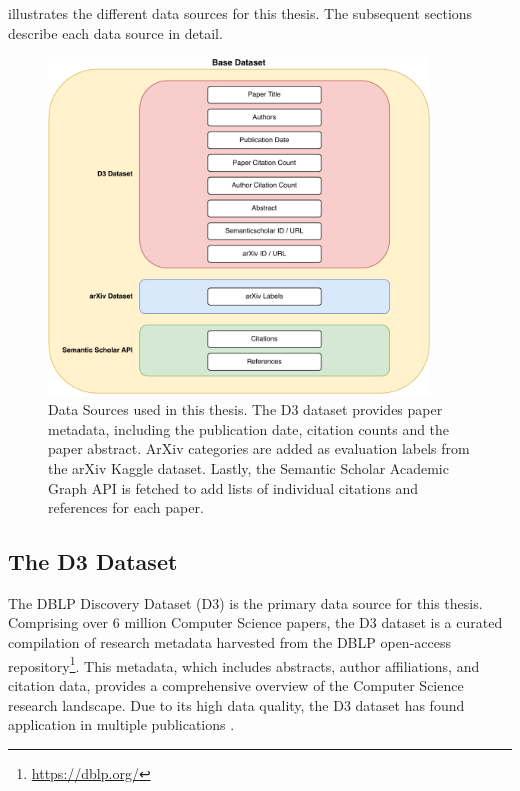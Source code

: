  illustrates the different data sources for this thesis. The subsequent sections describe each data source in detail.

\begin{figure}[htb!]
      \centering
      \includegraphics[width=0.9\textwidth]{diagrams/dataset_construction.pdf}
      \caption[Data Sources]{Data Sources used in this thesis. The D3 dataset provides paper metadata, including the publication date, citation counts and the paper abstract. ArXiv categories are added as evaluation labels from the arXiv Kaggle dataset. Lastly, the Semantic Scholar Academic Graph API is fetched to add lists of individual citations and references for each paper.}
      \label{fig:dataset-construction}
\end{figure}


\subsection{The D3 Dataset} \label{sec:d3-dataset}

The DBLP Discovery Dataset (D3) \cite{WahleD3Massive2022} is the primary data source for this thesis. Comprising over 6 million Computer Science papers, the D3 dataset is a curated compilation of research metadata harvested from the DBLP open-access repository\footnote{\url{https://dblp.org/}}. This metadata, which includes abstracts, author affiliations, and citation data, provides a comprehensive overview of the Computer Science research landscape.
Due to its high data quality, the D3 dataset has found application in multiple publications \cite{AbdallaElephantRoom2023,RuasCSInsightsSystem2023}.

